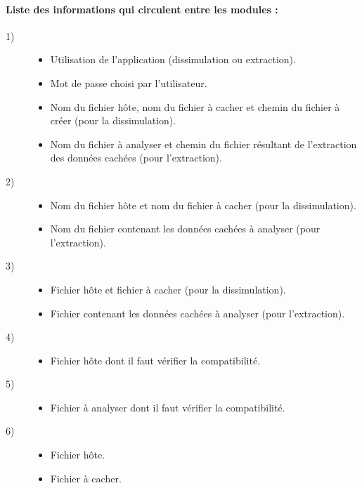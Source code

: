 \documentclass[11pt]{article}
\begin{document}
\paragraph{Liste des informations qui circulent entre les modules :}

\begin{multicols}{2}
\begin{description}
\item[1)] %
\begin{itemize}
\item Utilisation de l'application (dissimulation ou extraction).
\item Mot de passe choisi par l'utilisateur. 
\item Nom du fichier hôte, nom du fichier à cacher et chemin du fichier à créer
    (pour la dissimulation).
\item Nom du fichier à analyser et chemin du fichier résultant de l'extraction
    des données cachées (pour l'extraction).
\end{itemize}
\item[2)]  %
\begin{itemize}
\item Nom du fichier hôte et nom du fichier à cacher (pour la dissimulation).
\item Nom du fichier contenant les données cachées à analyser (pour l'extraction).
\end{itemize}
\item[3)] %
\begin{itemize}
\item Fichier hôte et fichier à cacher (pour la dissimulation). 
\item Fichier contenant les données cachées à analyser (pour l'extraction). 
\end{itemize}
\item[4)] %
\begin{itemize}
\item Fichier hôte dont il faut vérifier la compatibilité. 
\end{itemize}
\item[5)] %
\begin{itemize}
\item Fichier à analyser dont il faut vérifier la compatibilité.
\end{itemize}
\item[6)] %
\begin{itemize}
\item Fichier hôte.
\item Fichier à cacher.

\end{itemize}
\end{description}
\end{multicols}
\end{document}
